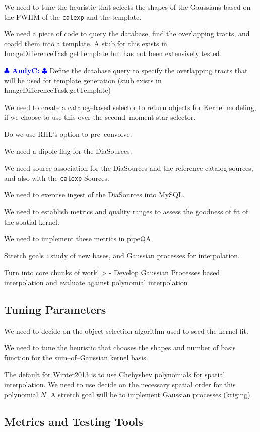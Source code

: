 \documentclass[12pt]{article}
\newcommand{\ajc} { \textcolor{blue} {
\ensuremath{\clubsuit} {\bf AndyC:}  
\ensuremath{\clubsuit} } }
\begin{document}
We need to tune the heuristic that selects the shapes of the Gaussians
based on the FWHM of the {\tt calexp} and the template.

We need a piece of code to query the database, find the overlapping
tracts, and coadd them into a template.  A stub for this exists in
ImageDifferenceTask.getTemplate but has not been extensively tested.

\ajc Define the database query to specify the overlapping tracts that
will be used for template generation (stub exists in
ImageDifferenceTask.getTemplate)

We need to create a catalog--based selector to return objects for
Kernel modeling, if we choose to use this over the second--moment star
selector.

Do we use RHL's option to pre--convolve.

We need a dipole flag for the DiaSources.

We need source association for the DiaSources and the reference
catalog sources, and also with the {\tt calexp} Sources.

We need to exercise ingest of the DiaSources into MySQL.

We need to establish metrics and quality ranges to assess the goodness
of fit of the spatial kernel.

We need to implement these metrics in pipeQA.

Stretch goals : study of new bases, and Gaussian processes for
interpolation.

Turn into core chunks of work!
> - Develop Gaussian Processes based interpolation and evaluate against polynomial interpolation

\subsection{Tuning Parameters}
We need to decide on the object selection algorithm used to seed the
kernel fit.

We need to tune the heuristic that chooses the shapes and number of
basis function for the sum--of--Gaussian kernel basis.

The default for Winter2013 is to use Chebyshev polynomials for spatial
interpolation.  We need to use decide on the necessary spatial order
for this polynomial $N$.  A stretch goal will be to implement Gaussian
processes (kriging).

\subsection{Metrics and Testing Tools}
\end{document}
